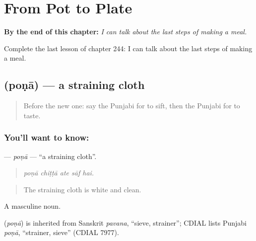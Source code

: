 
\chapter{From Pot to Plate}
\label{ch:pa-a2-from-pot-to-plate}

\begin{chapteropening}
\textbf{By the end of this chapter:} \emph{I can talk about the last steps of making a meal.}

Complete the last lesson of chapter 244: I can talk about the last steps of making a meal.
\end{chapteropening}

\section[\texorpdfstring{\pa{ਪੋਣਾ} (poṇā)}{ਪੋਣਾ (poṇā)}]{ (poṇā) — a straining cloth}

\label{lesson:PA-C244-pona}



\begin{quote}
Before the new one: say the Punjabi for to sift, then the Punjabi for to taste.
\end{quote}

\subsection*{You'll want to know: }
\textbf{} — \emph{poṇā} — \textquotedblleft{}a straining cloth\textquotedblright{}.

\begin{quote}
    
\end{quote}

\begin{quote}
\emph{poṇā chiṭṭā ate sāf hai.}
\end{quote}

\begin{quote}
The straining cloth is white and clean.
\end{quote}

A masculine noun.

\begin{cousinweb}
\textbf{} (\emph{poṇā}) is inherited from Sanskrit \emph{pavana}, \textquotedblleft{}sieve, strainer\textquotedblright{}; CDIAL lists Punjabi \emph{poṇā}, \textquotedblleft{}strainer, sieve\textquotedblright{} (CDIAL 7977).
\end{cousinweb}

